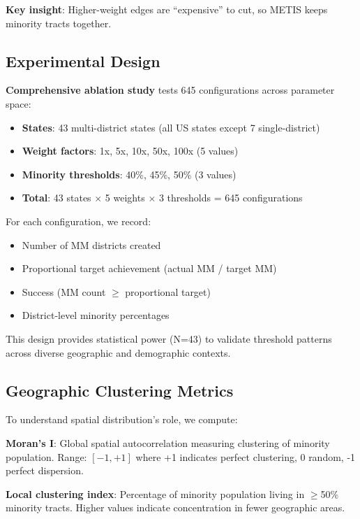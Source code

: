 \textbf{Key insight}: Higher-weight edges are ``expensive'' to cut, so METIS keeps minority tracts together.

\subsection{Experimental Design}

\textbf{Comprehensive ablation study} tests 645 configurations across parameter space:
\begin{itemize}
    \item \textbf{States}: 43 multi-district states (all US states except 7 single-district)
    \item \textbf{Weight factors}: 1x, 5x, 10x, 50x, 100x (5 values)
    \item \textbf{Minority thresholds}: 40\%, 45\%, 50\% (3 values)
    \item \textbf{Total}: 43 states $\times$ 5 weights $\times$ 3 thresholds = 645 configurations
\end{itemize}

For each configuration, we record:
\begin{itemize}
    \item Number of MM districts created
    \item Proportional target achievement (actual MM / target MM)
    \item Success (MM count $\geq$ proportional target)
    \item District-level minority percentages
\end{itemize}

This design provides statistical power (N=43) to validate threshold patterns across diverse geographic and demographic contexts.

\subsection{Geographic Clustering Metrics}

To understand spatial distribution's role, we compute:

\textbf{Moran's I}: Global spatial autocorrelation measuring clustering of minority population. Range: $[-1, +1]$ where +1 indicates perfect clustering, 0 random, -1 perfect dispersion.

\textbf{Local clustering index}: Percentage of minority population living in $\geq$50\% minority tracts. Higher values indicate concentration in fewer geographic areas.

